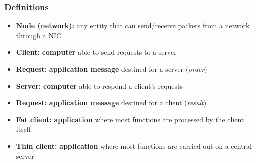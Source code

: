   \begin{frame}
    \frametitle{Definitions}
      \begin{itemize}
        \item \textbf{Node (network):} any entity that can send/receive packets from a network through a NIC\pause
        \item \textbf{Client:} \textbf{computer} able to send requests to a server\pause
        \item \textbf{Request:} \textbf{application message} destined for a server (\emph{order})\pause
        \item \textbf{Server:} \textbf{computer} able to respond a client's requests\pause
        \item \textbf{Request:} \textbf{application message} destined for a client (\emph{result})\pause
        \item \textbf{Fat client:} \textbf{application} where most functions are processed by the client itself\pause
        \item \textbf{Thin client:} \textbf{application} where most functions are carried out on a central server
      \end{itemize}
  \end{frame}

